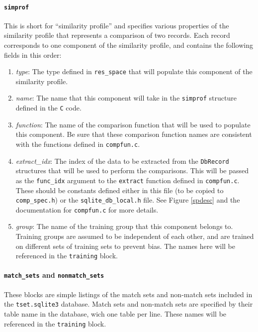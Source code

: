 \documentclass[10pt, letterpaper]{article}
\begin{document}
\paragraph{\texttt{simprof}}
This is short for ``similarity profile'' and specifies various properties of the similarity profile that represents a comparison of two records.
Each record corresponds to one component of the similarity profile, and contains the following fields in this order:
\begin{enumerate}
\item \emph{type}: The type defined in \texttt{res\_space} that will populate this component of the similarity profile.
\item \emph{name}: The name that this component will take in the \texttt{simprof} structure defined in the \texttt{C} code.
\item \emph{function}: The name of the comparison function that will be used to populate this component.
Be sure that these comparison function names are consistent with the functions defined in \texttt{compfun.c}.
\item \emph{extract\_idx}: The index of the data to be extracted from the \texttt{DbRecord} structures that will be used to perform the comparisons. This will be passed as the \texttt{func\_idx} argument to the \texttt{extract} function defined in \texttt{compfun.c}.
These should be constants defined either in this file (to be copied to \texttt{comp\_spec.h}) or the \texttt{sqlite\_db\_local.h} file. See Figure \ref{spdesc} and the documentation for \texttt{compfun.c} for more details.
\item \emph{group}: The name of the training group that this component belongs to. Training groups are assumed to be independent of each other, and are trained on different sets of training sets to prevent bias. The names here will be referenced in the \texttt{training} block.
\end{enumerate}
\paragraph{\texttt{match\_sets} and \texttt{nonmatch\_sets}}
These blocks are simple listings of the match sets and non-match sets included in the \texttt{tset.sqlite3} database.
Match sets and non-match sets are specified by their table name in the database, wich one table per line.
These names will be referenced in the \texttt{training} block. 
\end{document}
